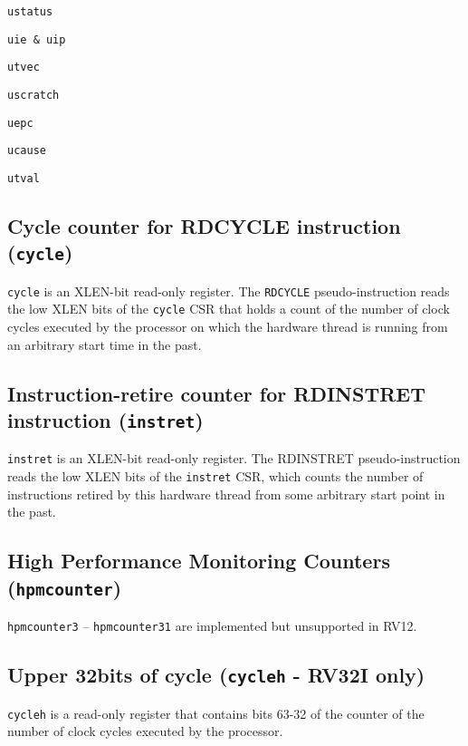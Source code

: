 	\texttt{ustatus}

	\texttt{uie \& uip}

	\texttt{utvec}

	\texttt{uscratch}

	\texttt{uepc}

	\texttt{ucause}

	\texttt{utval}


\subsection{Cycle counter for RDCYCLE instruction (\texttt{cycle})} \label{cycle-counter-for-rdcycle-instruction-cycle}

\texttt{cycle} is an XLEN-bit read-only register. The \texttt{RDCYCLE} pseudo-instruction
reads the low XLEN bits of the \texttt{cycle} CSR that holds a count of the
number of clock cycles executed by the processor on which the hardware
thread is running from an arbitrary start time in the past.

\subsection{Instruction-retire counter for RDINSTRET instruction
(\texttt{instret})}\label{instruction-retire-counter-for-rdinstret-instruction-instret}

\texttt{instret} is an XLEN-bit read-only register. The RDINSTRET
pseudo-instruction reads the low XLEN bits of the \texttt{instret} CSR, which
counts the number of instructions retired by this hardware thread from
some arbitrary start point in the past.

\subsection{High Performance Monitoring Counters (\texttt{hpmcounter})} \label{high-performance-monitoring-counters}

\texttt{hpmcounter3} -- \texttt{hpmcounter31} are implemented but unsupported in RV12.

\subsection{Upper 32bits of cycle (\texttt{cycleh} - RV32I
only)}\label{upper-32bits-of-cycle-cycleh---rv32i-only}

\texttt{cycleh} is a read-only register that contains bits 63-32 of the counter
of the number of clock cycles executed by the processor.

